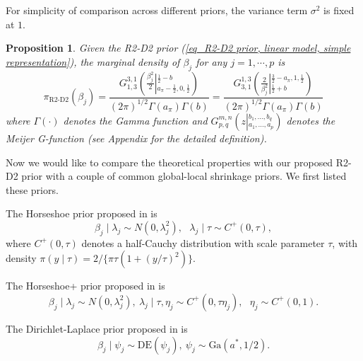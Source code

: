 \documentclass[12pt]{article}
\newtheorem{proposition}{Proposition}
\begin{document}
For simplicity of comparison across different priors, the  variance term $\sigma^2$ is fixed at  $1$.


\begin{proposition} \label{proposition_marginal density}
	Given the  R2-D2  prior (\ref{eq_R2-D2 prior, linear model, simple representation}), the marginal density of $\beta_j$ for any $j=1,\cdots, p$ is
	\begin{equation*} \label{eq_meijerG marginal density}
	\pi_{\text{R2-D2}}(\beta_j) =  \frac{	 G^{3,1}_{1,3}\left( \frac{\beta_j^2}{2} \left\vert_{a_\pi-\frac{1}{2},0,\frac{1}{2}}^{\frac{1}{2}-b}\right.\right)}{  {(2\pi)^{1/2}}\Gamma(a_\pi)\Gamma(b) }
	=  \frac{ G^{1,3}_{3,1}\left( \frac{2}{\beta_j^2} \left\vert_{ \frac{1}{2}+b }^{\frac{3}{2} -  a_\pi,1,\frac{1}{2}}\right.
		\right)  }{{(2 \pi)^{1/2}}\Gamma(a_\pi)\Gamma(b) }
	\end{equation*} where $\Gamma(\cdot)$ denotes the Gamma function and
	  $ G^{m,n}_{p,q}\left(z \left\vert_{a_1, \dots, a_p}^{b_1,\dots, b_q} \right.  \right)$ denotes the Meijer G-function (see Appendix for the   detailed definition).
\end{proposition}



Now we would like to compare the theoretical properties with our proposed R2-D2 prior with a couple of common global-local shrinkage priors. We first listed these priors.

The Horseshoe prior proposed in  \cite{carvalho2009handling,carvalho2010horseshoe} is
\[
\beta_j \mid\lambda_j \sim N(0, \lambda^2_j),  \text{   } \lambda_j \mid\tau  \sim C^+(0,\tau),
\]
where $C^+(0, \tau)$ denotes a half-Cauchy distribution with scale parameter $\tau$, with density
$\pi(y\mid\tau) = 2/\{\pi\tau (1+(y/\tau)^2)\}$.

The Horseshoe+ prior proposed in  \cite{bhadra2016horseshoe+} is
\[
\beta_j \mid\lambda_j \sim N(0, \lambda^2_j),  \    \lambda_j \mid\tau , \eta_j \sim C^+(0,\tau\eta_j),  \text{   }
\eta_j\sim C^+ (0,1).
\]

The Dirichlet-Laplace prior proposed in \cite{bhattacharya2015dirichlet} is
\begin{equation}   \label{eq_dl prior}
\beta_j\mid  \psi_j  \sim  \text{DE}(\psi_j),   \
\psi_j \sim \text{Ga}(a^\ast,1/2).
\end{equation}
\end{document}
